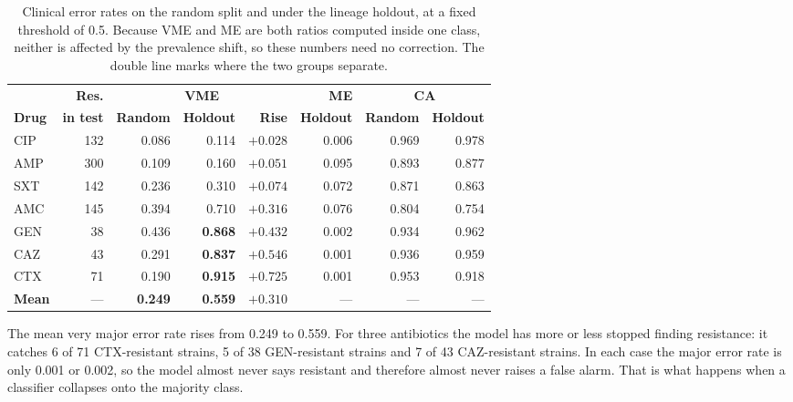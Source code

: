 \documentclass[conference]{IEEEtran}
\begin{document}
\begin{table}[t]
\caption{Clinical error rates on the random split and under the lineage holdout, at
a fixed threshold of 0.5. Because VME and ME are both ratios computed inside one
class, neither is affected by the prevalence shift, so these numbers need no
correction. The double line marks where the two groups separate.}
\label{tab:clinical}
\centering
\small
\setlength{\tabcolsep}{5pt}
\renewcommand{\arraystretch}{1.2}
\begin{tabular}{|l|r|r|r|r|r|r|r|}
\hline
\rowcolor{headgrey}
& \textbf{Res.} & \multicolumn{3}{c|}{\cellcolor{headgrey}\textbf{VME}} & \textbf{ME} & \multicolumn{2}{c|}{\cellcolor{headgrey}\textbf{CA}} \\ \cline{3-8}
\rowcolor{headgrey}
\textbf{Drug} & \textbf{in test} & \textbf{Random} & \textbf{Holdout} & \textbf{Rise} & \textbf{Holdout} & \textbf{Random} & \textbf{Holdout} \\ \hline
CIP & 132 & 0.086 & 0.114 & $+0.028$ & 0.006 & 0.969 & 0.978 \\ \hline
AMP & 300 & 0.109 & 0.160 & $+0.051$ & 0.095 & 0.893 & 0.877 \\ \hline
SXT & 142 & 0.236 & 0.310 & $+0.074$ & 0.072 & 0.871 & 0.863 \\ \hline\hline
AMC & 145 & 0.394 & 0.710 & $+0.316$ & 0.076 & 0.804 & 0.754 \\ \hline
GEN & 38 & 0.436 & \textbf{0.868} & $+0.432$ & 0.002 & 0.934 & 0.962 \\ \hline
CAZ & 43 & 0.291 & \textbf{0.837} & $+0.546$ & 0.001 & 0.936 & 0.959 \\ \hline
CTX & 71 & 0.190 & \textbf{0.915} & $+0.725$ & 0.001 & 0.953 & 0.918 \\ \hline
\rowcolor{oursblue}
\textbf{Mean} & --- & \textbf{0.249} & \textbf{0.559} & $\mathbf{+0.310}$ & --- & --- & --- \\ \hline
\end{tabular}
\renewcommand{\arraystretch}{1.0}
\end{table}

The mean very major error rate rises from 0.249 to 0.559. For three antibiotics the
model has more or less stopped finding resistance: it catches 6 of 71 CTX-resistant
strains, 5 of 38 GEN-resistant strains and 7 of 43 CAZ-resistant strains. In each
case the major error rate is only 0.001 or 0.002, so the model almost never says
resistant and therefore almost never raises a false alarm. That is what happens when
a classifier collapses onto the majority class.
\end{document}
